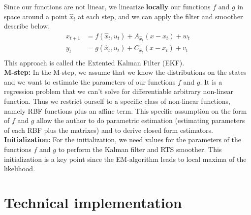 \documentclass[11pt, oneside]{amsart}
\begin{document}
Since our functions are not linear, we linearize \textbf{locally} our functions $f$ and $g$ in space around a point $\hat{x}_t$ at each step, and we can apply the filter and smoother describe below.   
\begin{align*}
	x_{t+1} &= f(\hat{x}_t, u_t) + A_{\hat{x}_t} (x - x_t) + w_t\\
	y_t &= g(\hat{x}_t, u_t) + C_{\hat{x}_t} (x - x_t) + v_t\\
\end{align*}
This approach is called the Extented Kalman Filter (EKF).\\

\noindent\textbf{M-step:}
In the M-step, we assume that we know the distributions on the states and we want to estimate the parameters of our functions $f$ and $g$.
It is a regression problem that we can't solve for differentiable arbitrary non-linear function.
Thus we restrict ourself to a specific class of non-linear functions, namely RBF functions plus an affine term. 
This specific assumption on the form of $f$ and $g$ allow the author to do parametric estimation (estimating parameters of each RBF plus the matrixes) and to derive closed form estimators. \\

\noindent\textbf{Initialization:} 
For the initialization, we need values for the parameters of the functions $f$ and $g$ to perform the Kalman filter and RTS smoother.
This initialization is a key point since the EM-algorithm leads to local maxima of the likelihood.\\

\section{Technical implementation}
\end{document}
